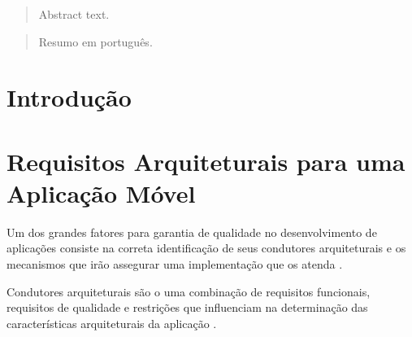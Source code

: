 \documentclass[
	article,			%
	11pt,				%
	oneside,			%
	a4paper,			%
	english,			%
	brazil,				%
	sumario=tradicional
]{abntex2}
\begin{document}
\maketitle

\begin{abstract}
Abstract text.
\end{abstract}


\begin{abstract}
Resumo em português.
\end{abstract}

\tableofcontents
	
\section{Introdução} \label{introduction}

\section{Requisitos Arquiteturais para uma Aplicação Móvel}
Um dos grandes fatores para garantia de qualidade no desenvolvimento de aplicações consiste na correta identificação de seus condutores arquiteturais e os mecanismos que irão assegurar uma implementação que os atenda \cite{bachmann2001introduction}.

Condutores arquiteturais são o uma combinação de requisitos funcionais, requisitos de qualidade e restrições que influenciam na determinação das características arquiteturais da aplicação \cite{bachmann2001introduction}.
\end{document}

